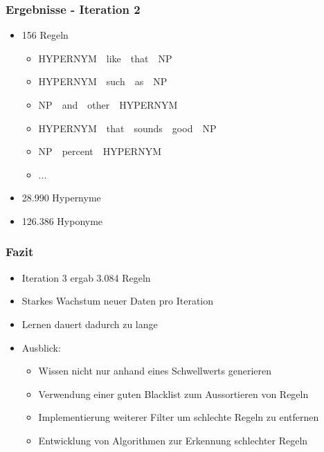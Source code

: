 \begin{frame}
  \frametitle{Ergebnisse - Iteration 2}

  \begin{itemize}
  \item 156 Regeln
    \begin{itemize}
    \item HYPERNYM~\textpipe~like~\textpipe~that~\textpipe~NP
    \item HYPERNYM~\textpipe~such~\textpipe~as~\textpipe~NP
    \item NP~\textpipe~and~\textpipe~other~\textpipe~HYPERNYM
    \item HYPERNYM~\textpipe~that~\textpipe~sounds~\textpipe~good~\textpipe~NP
    \item NP~\textpipe~percent~\textpipe~HYPERNYM
    \item ...
    \end{itemize}

  \item 28.990 Hypernyme
  \item 126.386 Hyponyme
  \end{itemize}
\end{frame}

\begin{frame}
  \frametitle{Fazit}

  \begin{itemize}
  \item Iteration 3 ergab 3.084 Regeln
  \item Starkes Wachstum neuer Daten pro Iteration
  \item Lernen dauert dadurch zu lange
  \item Ausblick:
    \begin{itemize}
    \item Wissen nicht nur anhand eines Schwellwerts generieren
    \item Verwendung einer guten Blacklist zum Aussortieren von Regeln
    \item Implementierung weiterer Filter um schlechte Regeln zu entfernen
    \item Entwicklung von Algorithmen zur Erkennung schlechter Regeln
    \end{itemize}
  \end{itemize}
\end{frame}
